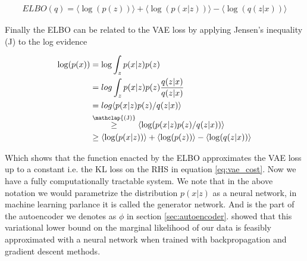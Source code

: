 \begin{align}
ELBO(q) = \langle \log(p(z)) \rangle +  \langle \log(p(x|z)) \rangle - \langle \log(q(z|x)) \rangle
\end{align}

\noindent Finally the ELBO can be related to the VAE loss by applying Jensen's inequality (J) to the log evidence 

\begin{align}
\log (p(x)) &= \log \int_z p(x|z) p(z) \\
&= log \int _z p(x|z) p(z) \frac{q(z|x)}{q(z|x)} \\
& = log \langle p(x|z) p(z)/ q(z|x) \rangle \\
&  \stackrel{\mathclap{\text{(J)}}}{\geq} \langle \log (p(x|z) p(z)/ q(z|x))\rangle \\
& \geq \langle \log(p(x|z))\rangle + \langle \log(p(z))\rangle  - \langle \log(q(z|x))\rangle 
\end{align}

\noindent Which shows that the function enacted by the ELBO approximates the VAE loss up to a constant i.e. the KL loss on the RHS in equation \ref{eq:vae_cost}. Now we have a fully computationally tractable system. We note that in the above notation we would parametrize the distribution $p(x|z)$ as a neural network, in machine learning parlance it is called the generator network. And is the part of the autoencoder we denotes as $\phi$ in section \ref{sec:autoencoder}. \citet{Kingma2013} showed that this variational lower bound on the marginal likelihood of our data is feasibly approximated with a neural network when trained with backpropagation and gradient descent methods. 
